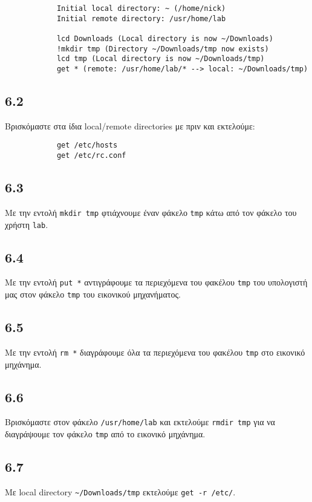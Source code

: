 \documentclass[a4paper, 12pt]{article}
\begin{document}
		\begin{verbatim}
			Initial local directory: ~ (/home/nick)
			Initial remote directory: /usr/home/lab
		
			lcd Downloads (Local directory is now ~/Downloads)
			!mkdir tmp (Directory ~/Downloads/tmp now exists)
			lcd tmp (Local directory is now ~/Downloads/tmp)
			get * (remote: /usr/home/lab/* --> local: ~/Downloads/tmp)
		\end{verbatim}

	\subsection*{6.2}
		Βρισκόμαστε στα ίδια local/remote directories με πριν και εκτελούμε:
		
		\begin{verbatim}
			get /etc/hosts
			get /etc/rc.conf
		\end{verbatim}

	\subsection*{6.3}
		Με την εντολή \verb|mkdir tmp| φτιάχνουμε έναν φάκελο \verb|tmp| κάτω από τον φάκελο του χρήστη \verb|lab|.

	\subsection*{6.4}
		Με την εντολή \verb|put *| αντιγράφουμε τα περιεχόμενα του φακέλου \verb|tmp| του υπολογιστή μας στον φάκελο \verb|tmp| του εικονικού μηχανήματος.

	\subsection*{6.5}
		Με την εντολή \verb|rm *| διαγράφουμε όλα τα περιεχόμενα του φακέλου \verb|tmp| στο εικονικό μηχάνημα.

	\subsection*{6.6}
		Βρισκόμαστε στον φάκελο \verb|/usr/home/lab| και εκτελούμε \verb|rmdir tmp| για να διαγράψουμε τον φάκελο \verb|tmp| από το εικονικό μηχάνημα.

	\subsection*{6.7}
		Με local directory \verb|~/Downloads/tmp| εκτελούμε \verb|get -r /etc/|.
\end{document}
